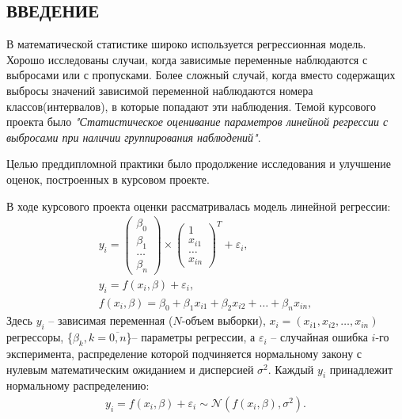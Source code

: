 \begin{center}
    \section*{ВВЕДЕНИЕ}
\end{center}
{}

В математической статистике широко используется регрессионная модель. Хорошо исследованы случаи, когда зависимые переменные наблюдаются с выбросами или с пропусками. Более сложный случай, когда вместо содержащих выбросы значений зависимой переменной наблюдаются номера классов(интервалов), в которые попадают эти наблюдения.
Темой курсового проекта было \textit{"Статистическое оценивание параметров линейной регрессии с выбросами при наличии группирования наблюдений"}.

Целью преддипломной практики было продолжение исследования и улучшение оценок, построенных в 
курсовом проекте. 

В ходе курсового проекта оценки рассматривалась модель линейной регрессии:
\begin{eqnarray}
    \label{eq2}y_i= 
    \begin{pmatrix}
        \beta_0\\
        \beta_1\\
        \dots\\
        \beta_n
    \end{pmatrix}\times
    \begin{pmatrix}
        1\\
        x_{i1}\\
        \dots\\
        x_{in}
    \end{pmatrix}^{T}+ \varepsilon_i,\\
    y_i= f(x_i,\beta)+\varepsilon_i,\\
    f(x_i,\beta)=\beta_0+\beta_1 x_{i1}+\beta_2 x_{i2}+\dots+\beta_n x_{in},
\end{eqnarray}
Здесь $y_i$ -- зависимая переменная ($N$-объем выборки), $x_i=(x_{i1},x_{i2},\dots,x_{in})$ регрессоры, \{$\beta_k, k=\overline{0,n}$\}-- параметры регрессии, а $\varepsilon_i$ -- случайная ошибка $i$-го эксперимента, распределение которой подчиняется нормальному закону с нулевым математическим ожиданием и дисперсией $\sigma^2$.
Каждый $y_i$ принадлежит нормальному распределению:
\begin{eqnarray}
    \label{eq12} y_i=f(x_i,\beta)+\varepsilon_i \sim \mathcal{N}(f(x_i,\beta),\sigma^2).
\end{eqnarray}

